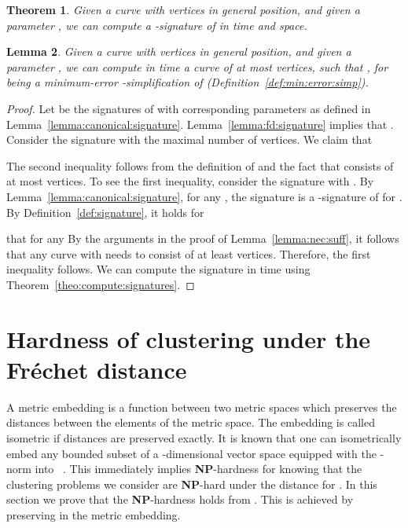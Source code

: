 \documentclass[11pt, letter]{article}
\newtheorem{theorem}{Theorem}[section]
\newtheorem{lemma}[theorem]{Lemma}
\newcommand{\seclab}[1]{\label{sec:#1}}
\newcommand{\thmlab}[1]{{\label{theo:#1}}}
\newcommand{\thmref}[1]{Theorem~\ref{theo:#1}}
\newcommand{\lemlab}[1]{\label{lemma:#1}}
\newcommand{\lemref}[1]{Lemma~\ref{lemma:#1}}
\newcommand{\defref}[1]{Definition~\ref{def:#1}}
\newcommand{\NP}{\textbf{NP}} \newcommand{\spine}{\textsl{spine}}
\newcommand{\Frechet}{Fr\'echet\xspace}
\begin{document}
\begin{theorem}\thmlab{computing:delta:signature}
Given a curve  with  vertices 
in general position, and given a parameter , we can compute a -signature of  in  time and space.
\end{theorem}



\begin{lemma}\lemlab{apx:min:error:simp}
Given a curve  with  vertices 
in general position, and given a parameter , we can compute in  time a curve  of at most  vertices, such that , for  being a minimum-error -simplification of  (\defref{min:error:simp}). 
\end{lemma}

\begin{proof}
Let  be the signatures of  with corresponding parameters  as defined in \lemref{canonical:signature}. \lemref{fd:signature} implies that . Consider the signature  with the maximal number of  vertices. We claim that 

The second inequality follows from the definition of  and the fact that  consists of at most  vertices. To see the first inequality, consider the signature  with . By \lemref{canonical:signature}, for any , the signature  is a -signature of  for . By \defref{signature}, it holds for

that for any  By the arguments in the proof of \lemref{nec:suff}, it follows that any curve  with  needs to consist of at least  vertices. Therefore, the first inequality follows. We can compute the signature  in  time using \thmref{compute:signatures}.
\end{proof}






\section{Hardness of clustering under the \Frechet distance}
\seclab{nphard}

A metric embedding is a function between two metric spaces which preserves the
distances between the elements of the metric space. The embedding is called
isometric if distances are preserved exactly. 
It is known that one can isometrically embed any bounded subset of a
-dimensional vector space equipped with the -norm into
~\cite{IndMat04}.
This immediately implies \NP-hardness for  knowing that 
the clustering problems we consider are \NP-hard under the
 distance for . In this section we prove that the \NP-hardness
holds from . This is achieved by preserving  in the
metric embedding. 
\end{document}
